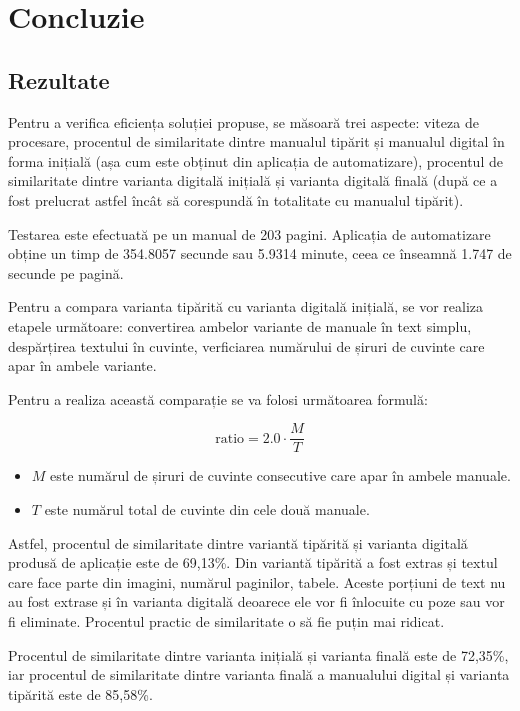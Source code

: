 \chapter{Concluzie}

\section{Rezultate}

Pentru a verifica eficiența soluției propuse, se măsoară trei aspecte: viteza de procesare, procentul de similaritate dintre manualul tipărit și manualul digital în forma inițială (așa cum este obținut din aplicația de automatizare), procentul de similaritate dintre varianta digitală inițială și varianta digitală finală (după ce a fost prelucrat astfel încât să corespundă în totalitate cu manualul tipărit).

Testarea este efectuată pe un manual de 203 pagini. Aplicația de automatizare obține un timp de 354.8057 secunde sau 5.9314 minute, ceea ce înseamnă 1.747 de secunde pe pagină.

Pentru a compara varianta tipărită cu varianta digitală inițială, se vor realiza etapele următoare: convertirea ambelor variante de manuale în text simplu, despărțirea textului în cuvinte, verficiarea numărului de șiruri de cuvinte care apar în ambele variante. 

Pentru a realiza această comparație se va folosi următoarea formulă:

\begin{center}
	\[
	\text{ratio} = 2.0 \cdot \frac{M}{T}
	\]
\end{center}


\begin{itemize}
	\item \( M \) este numărul de șiruri de cuvinte consecutive care apar în ambele manuale.
	\item \( T \) este numărul total de cuvinte din cele două manuale.
\end{itemize}

Astfel, procentul de similaritate dintre variantă tipărită și varianta digitală produsă de aplicație este de 69,13\%. Din variantă tipărită a fost extras și textul care face parte din imagini, numărul paginilor, tabele. Aceste porțiuni de text nu au fost extrase și în varianta digitală deoarece ele vor fi înlocuite cu poze sau vor fi eliminate. Procentul practic de similaritate o să fie puțin mai ridicat.

Procentul de similaritate dintre varianta inițială și varianta finală este de 72,35\%, iar procentul de similaritate dintre varianta finală a manualului digital și varianta tipărită este de 85,58\%. 


